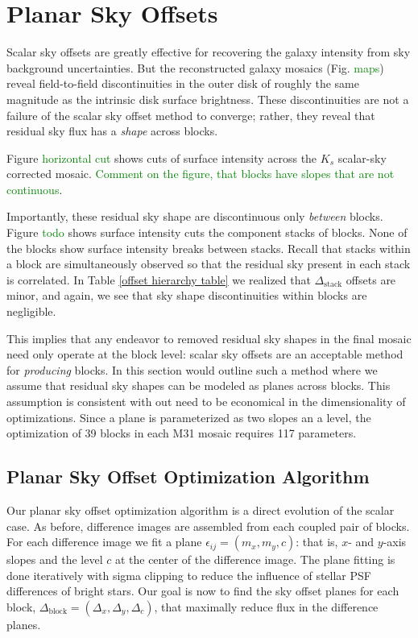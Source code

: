 \documentclass[iop]{emulateapj}
\newcommand{\todo}[1]{\textcolor{green}{#1}}
\begin{document}
\section{Planar Sky Offsets}

Scalar sky offsets are greatly effective for recovering the galaxy intensity from sky background uncertainties. But the reconstructed galaxy mosaics (Fig. \todo{maps}) reveal field-to-field discontinuities in the outer disk of roughly the same magnitude as the intrinsic disk surface brightness. These discontinuities are not a failure of the scalar sky offset method to converge; rather, they reveal that residual sky flux has a \emph{shape} across blocks.

Figure \todo{horizontal cut} shows cuts of surface intensity across the $K_s$ scalar-sky corrected mosaic. \todo{Comment on the figure, that blocks have slopes that are not continuous}.

Importantly, these residual sky shape are discontinuous only \emph{between} blocks. Figure \todo{todo} shows surface intensity cuts the component stacks of blocks. None of the blocks show surface intensity breaks between stacks. Recall that stacks within a block are simultaneously observed so that the residual sky present in each stack is correlated. In Table \ref{offset hierarchy table} we realized that $\Delta_\mathrm{stack}$ offsets are minor, and again, we see that sky shape discontinuities within blocks are negligible.

This implies that any endeavor to removed residual sky shapes in the final mosaic need only operate at the block level: scalar sky offsets are an acceptable method for \emph{producing} blocks. In this section would outline such a method where we assume that residual sky shapes can be modeled as planes across blocks. This assumption is consistent with out need to be economical in the dimensionality of optimizations. Since a plane is parameterized as two slopes an a level, the optimization of 39 blocks in each M31 mosaic requires 117 parameters.

\subsection{Planar Sky Offset Optimization Algorithm}

Our planar sky offset optimization algorithm is a direct evolution of the scalar case. As before, difference images are assembled from each coupled pair of blocks. For each difference image we fit a plane $\epsilon_{ij} = (m_x, m_y, c)$: that is, $x$- and $y$-axis slopes and the level $c$ at the center of the difference image. The plane fitting is done iteratively with sigma clipping to reduce the influence of stellar PSF differences of bright stars. Our goal is now to find the sky offset planes for each block, $\Delta_\mathrm{block} = (\Delta_x, \Delta_y, \Delta_c)$, that maximally reduce flux in the difference planes.
\end{document}
